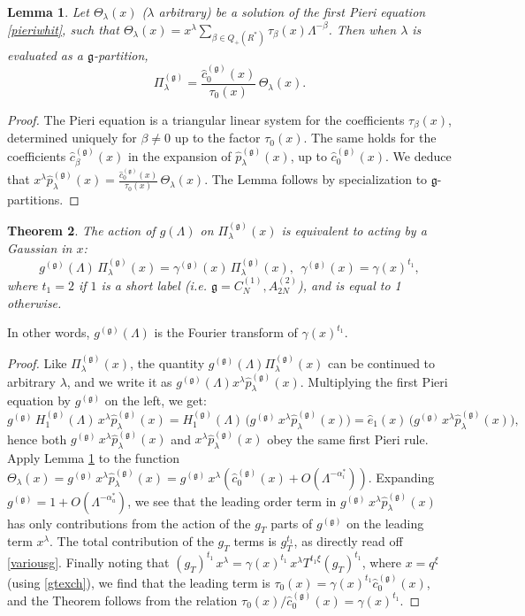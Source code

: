 \documentclass[12pt]{amsart}
\newtheorem{thm}{Theorem}[section]
\newtheorem{lemma}[thm]{Lemma}
\newcommand{\g}{{\mathfrak{g}}}
\newcommand{\al}{{\alpha}}
\newcommand{\lL}{{\Lambda}}
\numberwithin{equation}{section}
\begin{document}
\begin{lemma}\label{uniqueglem}
Let $\Theta_\lambda(x)$ ($\lambda$ arbitrary) be a solution of the first Pieri equation \eqref{pieriwhit}, such that
$\Theta_\lambda(x)=x^\lambda\sum_{\beta\in Q_+(R^*)} \tau_\beta(x)\lL^{-\beta}$.
Then when $\lambda$ is evaluated as a $\g$-partition,
$$\Pi_\lambda^{(\g)}=\frac{\hat c_0^{(\g)}(x)}{\tau_0(x)}\, \Theta_\lambda(x).$$
\end{lemma}
\begin{proof}
The Pieri equation is a triangular linear system for the coefficients $\tau_\beta(x)$, determined uniquely for $\beta\neq0$ up to the factor $\tau_0(x)$. The same holds for the coefficients $\hat c_\beta^{(\g)}(x)$ in the expansion of $\hat p_\lambda^{(\g)}(x)$, up to $\hat c_0^{(\g)}(x)$. We deduce that $x^\lambda \hat p_\lambda^{(\g)}(x)=
\frac{\hat c_0^{(\g)}(x)}{\tau_0(x)}\, \Theta_\lambda(x)$. The Lemma follows by specialization to 
$\g$-partitions.
\end{proof}
%
\begin{thm}\label{lemtwo}
The action of $g(\Lambda)$ on $\Pi_\lambda^{(\g)}(x)$ is equivalent to acting by a Gaussian in $x$:
\begin{equation}\label{ftga}
g^{(\g)}(\lL)\, \Pi_\lambda^{(\g)}(x) =\gamma^{(\g)}(x)\, \Pi_\lambda^{(\g)}(x),\ \ \gamma^{(\g)}(x)=\gamma(x)^{t_1},
\end{equation}
where 
%
 $t_1=2$ if $1$ is a short label (i.e. $\g=C_N^{(1)},A_{2N}^{(2)}$), and is equal to 1 otherwise.
%
%
%
%
%
%
%
\end{thm}
\noindent In other words, $g^{(\g)}(\Lambda)$ is the Fourier transform of $\gamma(x)^{t_1}$.
\begin{proof} 
Like $\Pi_\lambda^{(\g)}(x)$, the quantity $g^{(\g)}(\lL)\Pi_\lambda^{(\g)}(x)$ can be continued to 
arbitrary $\lambda$, and we write it as $g^{(\g)}(\lL) x^{\lambda} \hat p_\lambda^{(\g)}(x)$.
Multiplying the first Pieri equation by $g^{(\g)}$ on the left, we get:
$$g^{(\g)}\,H_1^{(\g)}(\lL)\, x^{\lambda} \hat p_\lambda^{(\g)}(x)=H_1^{(\g)}(\lL)\,\Big(g^{(\g)}\,x^{\lambda} \hat p_\lambda^{(\g)}(x)\Big)
={\hat e}_1(x)\,\Big(g^{(\g)}\,x^{\lambda} \hat p_\lambda^{(\g)}(x)\Big),$$
hence both $g^{(\g)}\,x^{\lambda} \hat p_\lambda^{(\g)}(x)$ and $x^{\lambda} \hat p_\lambda^{(\g)}(x)$ obey the same first Pieri rule. Apply Lemma \ref{uniqueglem} to the function 
$\Theta_\lambda(x)=g^{(\g)}\,x^{\lambda} \hat p_\lambda^{(\g)}(x)
=g^{(\g)}\,x^{\lambda}(\hat c_0^{(\g)}(x)+O(\lL^{-\al_i^*}))$. 
%
%
%
%
%
%
%
%
%
%
%
%
%
%
%
%
%
Expanding $g^{(\g)}=1+O(\lL^{-\alpha_a^*})$, we see that the leading order term
in $g^{(\g)}\,x^{\lambda} \hat p_\lambda^{(\g)}(x)$ has only contributions from the action of the $g_T$ parts of $g^{(\g)}$ on the leading term $x^\lambda$. The total contribution of the $g_T$ terms is $g_T^{t_1}$, as directly read off \eqref{variousg}. 
Finally noting that $(g_T)^{t_1} \,x^\lambda = \gamma(x)^{t_1} \, x^\lambda T^{t_1\xi}(g_T)^{t_1}$, where $x=q^\xi$ (using \eqref{gtexch}), we find that the leading term is $\tau_0(x)=\gamma(x)^{t_1}\hat c_0^{(\g)}(x)$,
and the Theorem follows from the relation $\tau_0(x)/\hat c_0^{(\g)}(x)=\gamma(x)^{t_1}$.
%
%
%
\end{proof}
\end{document}
